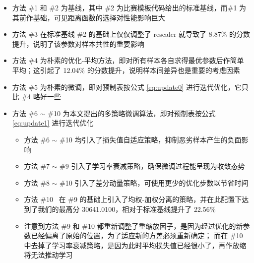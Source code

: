 \documentclass[withoutpreface,bwprint]{cumcmthesis}
\begin{document}
\begin{itemize}
\item 方法 \#1 和 \#2 为基线，其中 \#2 为比赛模板代码给出的标准基线，而\#1 为其前作基础，可见距离函数的选择对性能影响巨大
\item 方法 \#3 在标准基线 \#2 的基础上仅仅调整了 rescaler 就导致了 8.87\% 的分数提升，说明了该参数对样本共性的重要影响
\item 方法 \#4 为朴素的优化-平均方法，即对所有样本各自求得最优参数后作简单平均；这引起了 12.04\% 的分数提升，说明样本间差异也是重要的考虑因素
\item 方法 \#5 为朴素的微调，即对预制表按公式 \ref{eq:update0} 进行迭代优化，它只比 \#4 略好一些
\item 方法 \#6 $ \sim $ \#10 为本文提出的多策略微调算法，即对预制表按公式 \ref{eq:update1} 进行迭代优化
\begin{itemize}
  \item 方法 \#6 $ \sim $ \#10 均引入了损失值自适应策略，抑制恶劣样本产生的负面影响
  \item 方法 \#7 $ \sim $ \#9 引入了学习率衰减策略，确保微调过程能呈现为收敛态势
  \item 方法 \#8 $ \sim $ \#10 引入了差分动量策略，可使用更少的优化步数以节省时间
  \item 方法 \#10 \ 在 \#9 的基础上引入了均权-加权分离的策略，并在此配置下达到了我们的最高分 30641.0100，相对于标准基线提升了 22.56\%
  \item 注意到方法 \#9 和 \#10 都重新调整了重缩放因子，是因为经过优化的新参数已经偏离了原始的位置，为了适应新的方差必须重新确定；
            而在 \#10 中去掉了学习率衰减策略，是因为此时平均损失值已经很小了，再作放缩将无法推动学习
\end{itemize}
\end{itemize}
\end{document}
